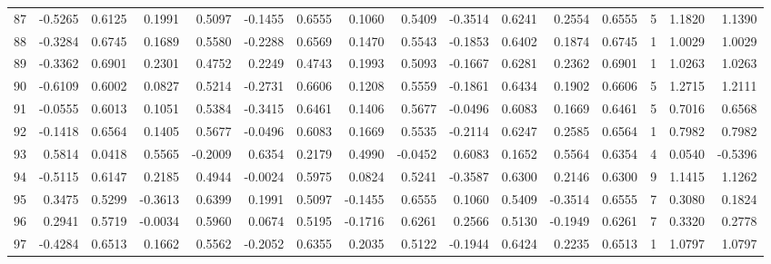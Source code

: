 \begin{tabular}{lrrrrrrrrrrrrrrr}
87  &     -0.5265 &  0.6125 &  0.1991 &  0.5097 & -0.1455 &  0.6555 &  0.1060 &  0.5409 & -0.3514 &  0.6241 &   0.2554 &     0.6555 &      5 &                    1.1820 &                     1.1390 \\
88  &     -0.3284 &  0.6745 &  0.1689 &  0.5580 & -0.2288 &  0.6569 &  0.1470 &  0.5543 & -0.1853 &  0.6402 &   0.1874 &     0.6745 &      1 &                    1.0029 &                     1.0029 \\
89  &     -0.3362 &  0.6901 &  0.2301 &  0.4752 &  0.2249 &  0.4743 &  0.1993 &  0.5093 & -0.1667 &  0.6281 &   0.2362 &     0.6901 &      1 &                    1.0263 &                     1.0263 \\
90  &     -0.6109 &  0.6002 &  0.0827 &  0.5214 & -0.2731 &  0.6606 &  0.1208 &  0.5559 & -0.1861 &  0.6434 &   0.1902 &     0.6606 &      5 &                    1.2715 &                     1.2111 \\
91  &     -0.0555 &  0.6013 &  0.1051 &  0.5384 & -0.3415 &  0.6461 &  0.1406 &  0.5677 & -0.0496 &  0.6083 &   0.1669 &     0.6461 &      5 &                    0.7016 &                     0.6568 \\
92  &     -0.1418 &  0.6564 &  0.1405 &  0.5677 & -0.0496 &  0.6083 &  0.1669 &  0.5535 & -0.2114 &  0.6247 &   0.2585 &     0.6564 &      1 &                    0.7982 &                     0.7982 \\
93  &      0.5814 &  0.0418 &  0.5565 & -0.2009 &  0.6354 &  0.2179 &  0.4990 & -0.0452 &  0.6083 &  0.1652 &   0.5564 &     0.6354 &      4 &                    0.0540 &                    -0.5396 \\
94  &     -0.5115 &  0.6147 &  0.2185 &  0.4944 & -0.0024 &  0.5975 &  0.0824 &  0.5241 & -0.3587 &  0.6300 &   0.2146 &     0.6300 &      9 &                    1.1415 &                     1.1262 \\
95  &      0.3475 &  0.5299 & -0.3613 &  0.6399 &  0.1991 &  0.5097 & -0.1455 &  0.6555 &  0.1060 &  0.5409 &  -0.3514 &     0.6555 &      7 &                    0.3080 &                     0.1824 \\
96  &      0.2941 &  0.5719 & -0.0034 &  0.5960 &  0.0674 &  0.5195 & -0.1716 &  0.6261 &  0.2566 &  0.5130 &  -0.1949 &     0.6261 &      7 &                    0.3320 &                     0.2778 \\
97  &     -0.4284 &  0.6513 &  0.1662 &  0.5562 & -0.2052 &  0.6355 &  0.2035 &  0.5122 & -0.1944 &  0.6424 &   0.2235 &     0.6513 &      1 &                    1.0797 &                     1.0797 \\

\end{tabular}
